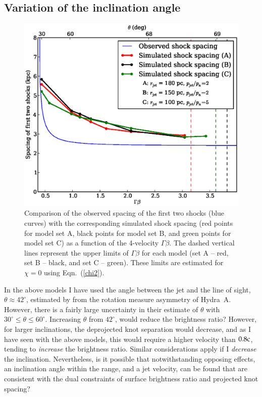 %
%
\subsection{Variation of the inclination angle}\label{s:theta}

 \begin{figure}
\centering
\includegraphics[width=\linewidth]{cts.eps}
\caption{Comparison of the observed  spacing  of the first two shocks (blue curves) with the corresponding simulated shock spacing (red points for model set A, black points for model set B, and green points for model set C) as a function of the 4-velocity $\Gamma \beta$. The dashed vertical lines represent the upper limits of $\Gamma \beta$ for each model (set A -- red, set B -- black, and set C -- green). These limits are estimated for $\chi = 0$ using Eqn.~(\ref{chi2}).}
\label{f:ss}
\end{figure}

In the above models I have used the angle between the jet and the line of sight, $\theta \approx 42^\circ$, estimated by \citet{taylor93} from the rotation measure asymmetry of Hydra~A. However, there is a fairly large uncertainty in their estimate of $\theta$ with $30^\circ \leq \theta \leq 60^\circ$. Increasing $\theta$ from $42^{\circ}$, would reduce the brightness ratio? However, for larger inclinations, the deprojected knot separation would decrease, and as I have seen with the above models, this would require a higher velocity than $0.8 \rm c$, tending to \emph{increase} the brightness ratio. Similar considerations apply if I \emph{decrease} the inclination. Nevertheless, is it possible that notwithstanding opposing effects, an inclination angle within the \citet{taylor90} range, and a jet velocity, can be found that are consistent with the dual constraints of surface brightness ratio and projected knot spacing? 

